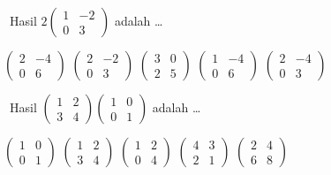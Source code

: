 \documentclass[11pt,a4paper]{exam}
\newcommand{\Inter}{{\footnotesize\textsf{\textcolor{biru}{[Intermediate]}}}\ }
\begin{document}
\begin{questions}
\question \Inter Hasil $2\begin{pmatrix} 1 & -2\\ 0 & 3 \end{pmatrix}$ adalah \dots
\begin{choices}
\CorrectChoice $\begin{pmatrix} 2 & -4\\ 0 & 6 \end{pmatrix}$
\choice $\begin{pmatrix} 2 & -2\\ 0 & 3 \end{pmatrix}$
\choice $\begin{pmatrix} 3 & 0\\ 2 & 5 \end{pmatrix}$
\choice $\begin{pmatrix} 1 & -4\\ 0 & 6 \end{pmatrix}$
\choice $\begin{pmatrix} 2 & -4\\ 0 & 3 \end{pmatrix}$
\end{choices}

\question \Inter Hasil $\begin{pmatrix} 1 & 2\\ 3 & 4 \end{pmatrix}
\begin{pmatrix} 1 & 0\\ 0 & 1 \end{pmatrix}$ adalah \dots
\begin{choices}
\choice $\begin{pmatrix} 1 & 0\\ 0 & 1 \end{pmatrix}$
\CorrectChoice $\begin{pmatrix} 1 & 2\\ 3 & 4 \end{pmatrix}$
\choice $\begin{pmatrix} 1 & 2\\ 0 & 4 \end{pmatrix}$
\choice $\begin{pmatrix} 4 & 3\\ 2 & 1 \end{pmatrix}$
\choice $\begin{pmatrix} 2 & 4\\ 6 & 8 \end{pmatrix}$
\end{choices}


\end{questions}
\end{document}
